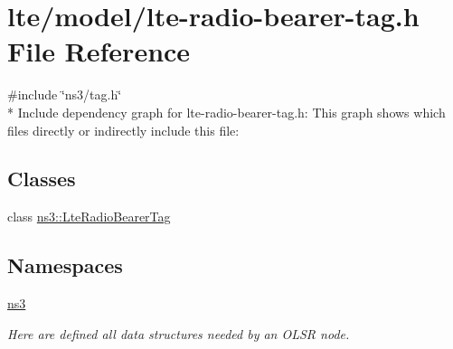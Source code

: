 \hypertarget{lte-radio-bearer-tag_8h}{}\section{lte/model/lte-\/radio-\/bearer-\/tag.h File Reference}
\label{lte-radio-bearer-tag_8h}
{\ttfamily \#include \char`\"{}ns3/tag.\+h\char`\"{}}\\*
Include dependency graph for lte-\/radio-\/bearer-\/tag.h\+:
This graph shows which files directly or indirectly include this file\+:
\subsection*{Classes}
\begin{DoxyCompactItemize}
\item 
class \hyperlink{classns3_1_1LteRadioBearerTag}{ns3\+::\+Lte\+Radio\+Bearer\+Tag}
\end{DoxyCompactItemize}
\subsection*{Namespaces}
\begin{DoxyCompactItemize}
\item 
 \hyperlink{namespacens3}{ns3}
\begin{DoxyCompactList}\small\item\em Here are defined all data structures needed by an O\+L\+SR node. \end{DoxyCompactList}\end{DoxyCompactItemize}
